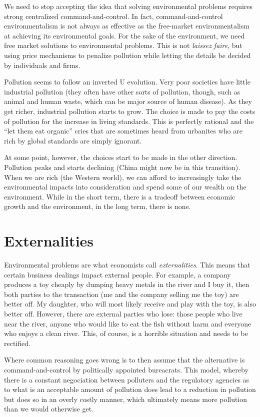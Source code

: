We need to stop accepting the idea that solving environmental problems requires
strong centralized command-and-control. In fact, command-and-control
environmentalism is not always as effective as the free-market environmentalism
at achieving its environmental goals. For the sake of the environment, we need
free market solutions to environmental problems. This is not \emph{laissez
faire}, but using price mechanisms to penalize pollution while letting the
details be decided by individuals and firms.

Pollution seems to follow an inverted U evolution. Very poor societies have
little industrial pollution (they often have other sorts of pollution, though,
such as animal and human waste, which can be major source of human disease). As
they get richer, industrial pollution starts to grow. The choice is made to pay
the costs of pollution for the increase in living standards. This is perfectly
rational and the ``let them eat organic'' cries that are sometimes heard from
urbanites who are rich by global standards are simply ignorant.

At some point, however, the choices start to be made in the other direction.
Pollution peaks and starts declining (China might now be in this transition).
When we are rich (the Western world), we can afford to increasingly take the
environmental impacts into consideration and spend some of our wealth on the
environment.  While in the short term, there is a tradeoff between economic
growth and the environment, in the long term, there is none.

\section{Externalities}

Environmental problems are what economists call \emph{externalities}. This
means that certain business dealings impact external people. For example, a
company produces a toy cheaply by dumping heavy metals in the river and I buy
it, then both parties to the transaction (me and the company selling me the
toy) are better off. My daughter, who will most likely receive and play with
the toy, is also better off. However, there are external parties who lose:
those people who live near the river, anyone who would like to eat the fish
without harm and everyone who enjoys a clean river. This, of course, is a
horrible situation and needs to be rectified.

Where common reasoning goes wrong is to then assume that the alternative is
command-and-control by politically appointed bureacrats. This model, whereby
there is a constant negociation between polluters and the regulatory agencies
as to what is an acceptable amount of pollution does lead to a reduction in
pollution but does so in an overly costly manner, which ultimately means more
pollution than we would otherwise get.

